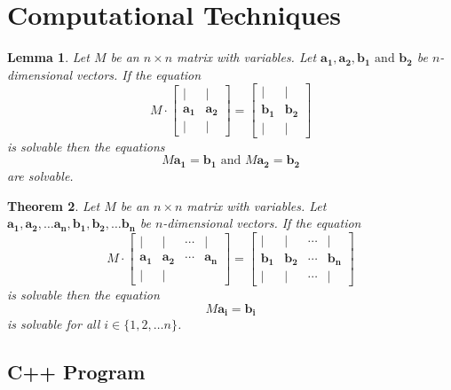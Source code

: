 \documentclass[a4paper,10pt]{article}
\theoremstyle{plain}
\newtheorem{Theorem}{Theorem}
\newtheorem{Lemma}[Theorem]{Lemma}
\theoremstyle{definition}
\theoremstyle{remark}
\renewcommand{\vec}[1]{\mathbf{#1}}
\begin{document}
\section{Computational Techniques}

\begin{Lemma}
	Let \( M \) be an \( n \times n \) matrix with variables.
	Let \( \vec{a_1}, \vec{a_2}, \vec{b_1} \text{ and } \vec{b_2} \) be \( n \)-dimensional vectors.
	If the equation \[
	M
	\cdot
	\begin{bmatrix}
		| & | \\
		\vec{a_1} & \vec{a_2} \\
		| & |
	\end{bmatrix}
	=
	\begin{bmatrix}
		| & | \\
		\vec{b_1} & \vec{b_2} \\
		| & |
	\end{bmatrix}
	\]
	is solvable then the equations \[M\vec{a_1} = \vec{b_1} \text{ and } M\vec{a_2} = \vec{b_2}\] are solvable.
\end{Lemma}
\begin{Theorem}
	Let \( M \) be an \( n \times n \) matrix with variables.
	Let \( \vec{a_1}, \vec{a_2}, \dots \vec{a_n}, \vec{b_1}, \vec{b_2}, \dots \vec{b_n} \) be \( n \)-dimensional vectors.
	If the equation \[
	M
	\cdot
	\begin{bmatrix}
		| & | & \cdots & |\\
		\vec{a_1} & \vec{a_2} & \cdots & \vec{a_n} \\
		| & |
	\end{bmatrix}
	=
	\begin{bmatrix}
		| & | & \cdots & |\\
		\vec{b_1} & \vec{b_2} & \cdots & \vec{b_n} \\
		| & | & \cdots & |
	\end{bmatrix}
	\]
	is solvable then the equation \[M\vec{a_i} = \vec{b_i}\] is solvable for all \( i \in \{1, 2, \dots n\} \).
\end{Theorem}

\subsection{C++ Program}
\end{document}
